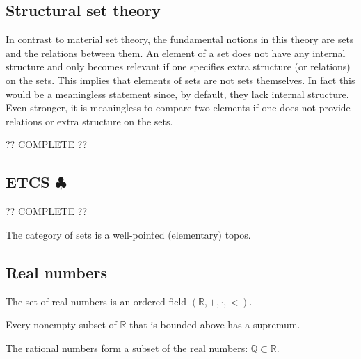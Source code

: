 \subsection{Structural set theory}

    In contrast to material set theory, the fundamental notions in this theory are sets and the relations between them. An element of a set does not have any internal structure and only becomes relevant if one specifies extra structure (or relations) on the sets. This implies that elements of sets are not sets themselves. In fact this would be a meaningless statement since, by default, they lack internal structure. Even stronger, it is meaningless to compare two elements if one does not provide relations or extra structure on the sets.

    ?? COMPLETE ??

\subsection{\texorpdfstring{ETCS $\clubsuit$}{ETCS}}

    ?? COMPLETE ??


    \begin{axiom}
        The category of sets is a well-pointed (elementary) topos.
    \end{axiom}

\subsection{Real numbers}

    \begin{axiom}[Ordering]
        The set of real numbers is an ordered field $(\mathbb{R},+,\cdot,<)$.
    \end{axiom}
    \begin{axiom}
        Every nonempty subset of $\mathbb{R}$ that is bounded above has a supremum.
    \end{axiom}

    \begin{axiom}
        The rational numbers form a subset of the real numbers: $\mathbb{Q}\subset\mathbb{R}$.
    \end{axiom}

